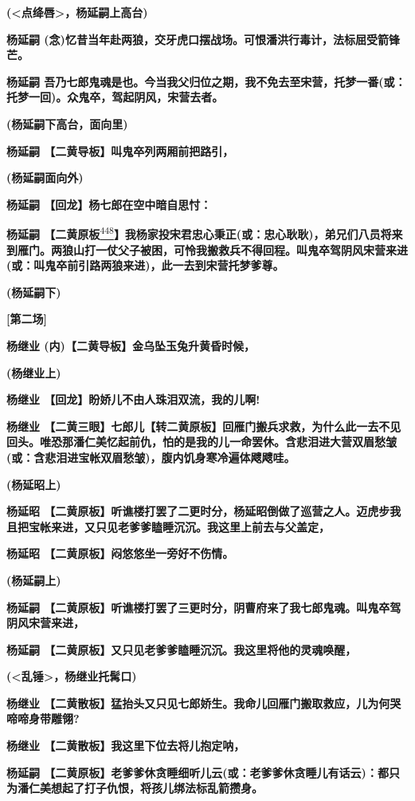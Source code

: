\textbf{(\textless{}点绛唇\textgreater{}，杨延嗣上高台)}

\textbf{杨延嗣
(念)忆昔当年赴两狼，交牙虎口摆战场。可恨潘洪行毒计，法标屈受箭锋芒。}

\textbf{杨延嗣
吾乃七郎鬼魂是也。今当我父归位之期，我不免去至宋营，托梦一番(或：托梦一回)。众鬼卒，驾起阴风，宋营去者。}

\textbf{(杨延嗣下高台，面向里)}

\textbf{杨延嗣 【二黄导板】叫鬼卒列两厢前把路引，}

\textbf{(杨延嗣面向外)}

\textbf{杨延嗣 【回龙】杨七郎在空中暗自思忖：}

\textbf{杨延嗣
【二黄原板}\protect\hyperlink{fn448}{\textsuperscript{448}}\textbf{】我杨家投宋君忠心秉正(或：忠心耿耿)，弟兄们八员将来到雁门。两狼山打一仗父子被困，可怜我搬救兵不得回程。叫鬼卒驾阴风宋营来进(或：叫鬼卒前引路两狼来进)，此一去到宋营托梦爹尊。}

\textbf{(杨延嗣下)}

\textbf{{[}第二场{]}}

\textbf{杨继业 (内)【二黄导板】金乌坠玉兔升黄昏时候，}

\textbf{(杨继业上)}

\textbf{杨继业 【回龙】盼娇儿不由人珠泪双流，我的儿啊!}

\textbf{杨继业
【二黄三眼】七郎儿【转二黄原板】回雁门搬兵求救，为什么此一去不见回头。唯恐那潘仁美忆起前仇，怕的是我的儿一命罢休。含悲泪进大营双眉愁皱(或：含悲泪进宝帐双眉愁皱)，腹内饥身寒冷遍体飕飕哇。}

\textbf{(杨延昭上)}

\textbf{杨延昭
【二黄原板】听谯楼打罢了二更时分，杨延昭倒做了巡营之人。迈虎步我且把宝帐来进，又只见老爹爹瞌睡沉沉。我这里上前去与父盖定，}

\textbf{杨延昭 【二黄原板】闷悠悠坐一旁好不伤情。}

\textbf{(杨延嗣上)}

\textbf{杨延嗣
【二黄原板】听谯楼打罢了三更时分，阴曹府来了我七郎鬼魂。叫鬼卒驾阴风宋营来进，}

\textbf{杨延嗣 【二黄原板】又只见老爹爹瞌睡沉沉。我这里将他的灵魂唤醒，}

\textbf{(\textless{}乱锤\textgreater{}，杨继业托髯口)}

\textbf{杨继业
【二黄散板】猛抬头又只见七郎娇生。我命儿回雁门搬取救应，儿为何哭啼啼身带雕翎?}

\textbf{杨继业 【二黄散板】我这里下位去将儿抱定呐，}

\textbf{杨延嗣
【二黄原板】老爹爹休贪睡细听儿云(或：老爹爹休贪睡儿有话云)：都只为潘仁美想起了打子仇恨，将孩儿绑法标乱箭攒身。}

